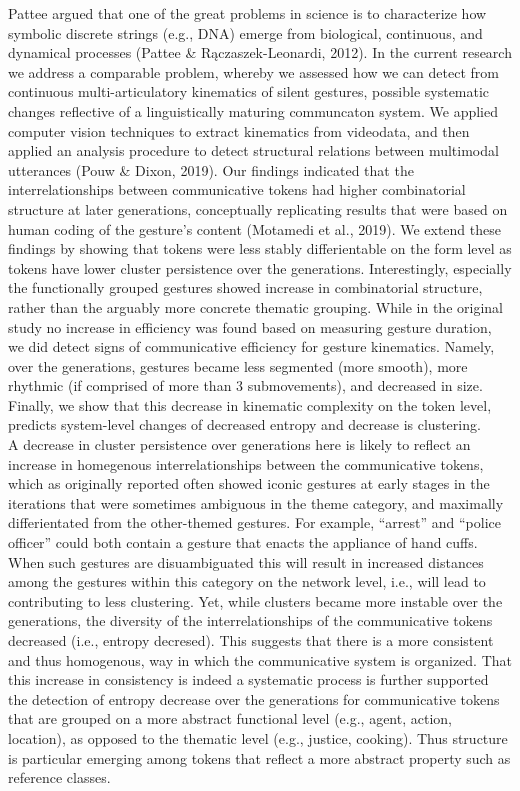 \documentclass[
  man, noextraspace,floatsintext]{apa6}
\begin{document}
Pattee argued that one of the great problems in science is to characterize how symbolic discrete strings (e.g., DNA) emerge from biological, continuous, and dynamical processes (Pattee \& Rączaszek-Leonardi, 2012). In the current research we address a comparable problem, whereby we assessed how we can detect from continuous multi-articulatory kinematics of silent gestures, possible systematic changes reflective of a linguistically maturing communcaton system. We applied computer vision techniques to extract kinematics from videodata, and then applied an analysis procedure to detect structural relations between multimodal utterances (Pouw \& Dixon, 2019).
Our findings indicated that the interrelationships between communicative tokens had higher combinatorial structure at later generations, conceptually replicating results that were based on human coding of the gesture's content (Motamedi et al., 2019). We extend these findings by showing that tokens were less stably differientable on the form level as tokens have lower cluster persistence over the generations. Interestingly, especially the functionally grouped gestures showed increase in combinatorial structure, rather than the arguably more concrete thematic grouping. While in the original study no increase in efficiency was found based on measuring gesture duration, we did detect signs of communicative efficiency for gesture kinematics. Namely, over the generations, gestures became less segmented (more smooth), more rhythmic (if comprised of more than 3 submovements), and decreased in size. Finally, we show that this decrease in kinematic complexity on the token level, predicts system-level changes of decreased entropy and decrease is clustering.\\
A decrease in cluster persistence over generations here is likely to reflect an increase in homegenous interrelationships between the communicative tokens, which as originally reported often showed iconic gestures at early stages in the iterations that were sometimes ambiguous in the theme category, and maximally differientated from the other-themed gestures. For example, ``arrest'' and ``police officer'' could both contain a gesture that enacts the appliance of hand cuffs. When such gestures are disuambiguated this will result in increased distances among the gestures within this category on the network level, i.e., will lead to contributing to less clustering. Yet, while clusters became more instable over the generations, the diversity of the interrelationships of the communicative tokens decreased (i.e., entropy decresed). This suggests that there is a more consistent and thus homogenous, way in which the communicative system is organized. That this increase in consistency is indeed a systematic process is further supported the detection of entropy decrease over the generations for communicative tokens that are grouped on a more abstract functional level (e.g., agent, action, location), as opposed to the thematic level (e.g., justice, cooking). Thus structure is particular emerging among tokens that reflect a more abstract property such as reference classes.\\
\end{document}
